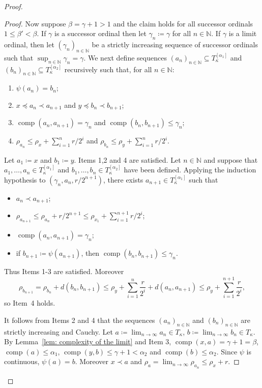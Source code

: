 \documentclass[10pt,a4paper]{amsart}
\DeclareMathOperator{\comp}{comp}
\begin{document}
\begin{proof}
\begin{proof}
    	Now suppose $\beta = \gamma + 1> 1$ and the claim holds for all successor ordinals $1 \leq \beta' < \beta$. If $\gamma$ is a successor ordinal then let $\gamma_n \coloneqq \gamma$ for all $n \in \mathbb{N}$. If $\gamma$ is a limit ordinal, then let $(\gamma_n)_{n \in \mathbb{N}}$ be a strictly increasing sequence of successor ordinals such that $\sup_{n \in \mathbb{N}} \gamma_n = \gamma$.  We next define sequences $(a_n)_{n \in \mathbb{N}} \subseteq T_\kappa^{[\alpha_1]}$ and $(b_n)_{n \in \mathbb{N}} \subseteq T_\kappa^{[\alpha_2]}$ recursively such that, for all $n \in \mathbb{N}$:
    	\begin{enumerate}
    		\item $\psi(a_n) = b_n$;
    		\item $x \preceq a_n \prec a_{n+1}$ and $y \preceq b_n \prec b_{n+1}$;
    		\item $\comp(a_n,a_{n+1}) = \gamma_{n}$ and $\comp(b_n,b_{n+1}) \leq \gamma_{n}$;
    		\item $\rho_{a_n} \leq \rho_{x} + \sum_{i=1}^n r/2^i$ and $\rho_{b_n} \leq \rho_{y} + \sum_{i=1}^n r/2^i$.
    	\end{enumerate}
    	Let $a_1 \coloneqq x$ and $b_1 \coloneqq y$. Items 1,2 and 4 are satisfied. Let $n \in \mathbb{N}$ and suppose that $a_1, \dots, a_n \in T_\kappa^{[\alpha_1]}$ and $b_1, \dots, b_n \in T_\kappa^{[\alpha_2]}$ have been defined. Applying the induction hypothesis to $(\gamma_{n}, a_n, r/2^{n+1})$, there exists $a_{n+1} \in T_\kappa^{[\alpha_1]}$ such that 
    	\begin{itemize} 
    		\item[i.] $a_n \prec a_{n+1}$;
    		\item[ii.] $\rho_{a_{n+1}} \leq \rho_{a_n} + r/2^{n+1} \leq \rho_{x_1} + \sum_{i=1}^{n+1} r/2^i$;
    		\item[iii.] $\comp(a_n, a_{n+1}) = \gamma_{n}$;
    		\item[iv.] if $b_{n+1} \coloneqq \psi(a_{n+1})$, then $\comp(b_n, b_{n+1}) \leq \gamma_{n}$.
    	\end{itemize}
    	Thus Items 1-3 are satisfied. Moreover 
    	\[
    	\rho_{b_{n+1}} = \rho_{b_n} + d(b_n, b_{n+1}) \leq \rho_{y} + \sum_{i=1}^n \frac{r}{2^i} + d(a_n, a_{n+1}) \leq \rho_{y} + \sum_{i=1}^{n+1} \frac{r}{2^i},
    	\]
    	so Item~4 holds.
    	
    	It follows from Items 2 and 4 that the sequences $(a_n)_{n \in \mathbb{N}}$ and $(b_n)_{n \in \mathbb{N}}$ are strictly increasing and Cauchy. Let $a \coloneqq \lim_{n \rightarrow \infty} a_n \in T_\kappa$, $b \coloneqq \lim_{n \rightarrow \infty} b_n \in T_\kappa$. By Lemma~\ref{lem: complexity of the limit} and Item 3, $\comp(x,a) = \gamma + 1 = \beta$, $\comp(a) \leq \alpha_1$, $\comp(y,b) \leq \gamma + 1 < \alpha_2$ and $\comp(b) \leq \alpha_2$. Since $\psi$ is continuous, $\psi(a) = b$.
    	Moreover $x \prec a$ and $\rho_{a} = \lim_{n \rightarrow \infty} \rho_{a_n} \leq \rho_{x} + r$.
    \end{proof}


\end{proof}
\end{document}
